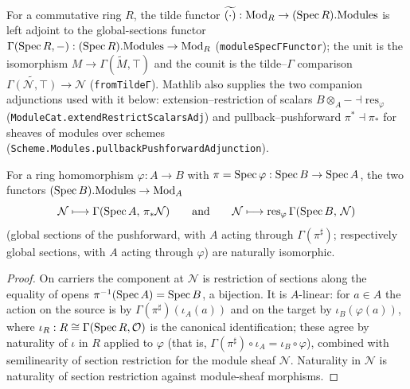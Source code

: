 \begin{lemma}
  \label{mk-lem:tilde_gamma_adjunction_mathlib}
  \mathlibok

  For a commutative ring \(R\), the tilde functor
  \(\widetilde{(\cdot)} : \mathrm{Mod}_{R} \to (\operatorname{Spec} R).\mathrm{Modules}\)
  is left adjoint to the global-sections functor
  \(\Gamma(\operatorname{Spec} R, -) : (\operatorname{Spec} R).\mathrm{Modules} \to \mathrm{Mod}_{R}\)
  (\texttt{moduleSpecΓFunctor}); the unit is the isomorphism
  \(M \to \Gamma(\widetilde M, \top)\) and the counit is the
  tilde--\(\Gamma\) comparison
  \(\widetilde{\Gamma(\mathcal N, \top)} \to \mathcal N\)
  (\texttt{fromTildeΓ}). Mathlib also supplies the two companion
  adjunctions used with it below: extension--restriction of scalars
  \(B \otimes_A - \dashv \mathrm{res}_\varphi\)
  (\texttt{ModuleCat.extendRestrictScalarsAdj}) and
  pullback--pushforward \(\pi^* \dashv \pi_*\) for sheaves of modules
  over schemes (\texttt{Scheme.Modules.pullbackPushforwardAdjunction}).
\end{lemma}

\begin{lemma}
  \label{mk-lem:pullbackTilde_gammaBridge}
  \leanok

  For a ring homomorphism \(\varphi : A \to B\) with
  \(\pi = \operatorname{Spec}\varphi : \operatorname{Spec} B \to \operatorname{Spec} A\), the two functors
  \((\operatorname{Spec} B).\mathrm{Modules} \to \mathrm{Mod}_{A}\)
  \[
    \mathcal N \longmapsto \Gamma(\operatorname{Spec} A,\, \pi_{*}\mathcal N)
    \qquad\text{and}\qquad
    \mathcal N \longmapsto \mathrm{res}_{\varphi}\, \Gamma(\operatorname{Spec} B,\, \mathcal N)
  \]
  (global sections of the pushforward, with \(A\) acting through
  \(\Gamma(\pi^{\sharp})\); respectively global sections, with \(A\)
  acting through \(\varphi\)) are naturally isomorphic.
\end{lemma}
\begin{proof}
  \leanok
  On carriers the component at \(\mathcal N\) is restriction of sections
  along the equality of opens \(\pi^{-1}(\operatorname{Spec} A) = \operatorname{Spec} B\), a
  bijection. It is \(A\)-linear: for \(a \in A\) the action on the
  source is by \(\Gamma(\pi^{\sharp})(\iota_A(a))\) and on the target by
  \(\iota_B(\varphi(a))\), where
  \(\iota_R : R \cong \Gamma(\operatorname{Spec} R, \mathcal O)\) is the canonical
  identification; these agree by naturality of \(\iota\) in \(R\)
  applied to \(\varphi\) (that is,
  \(\Gamma(\pi^{\sharp}) \circ \iota_A = \iota_B \circ \varphi\)),
  combined with semilinearity of section restriction for the module
  sheaf \(\mathcal N\). Naturality in \(\mathcal N\) is naturality of
  section restriction against module-sheaf morphisms.
\end{proof}

